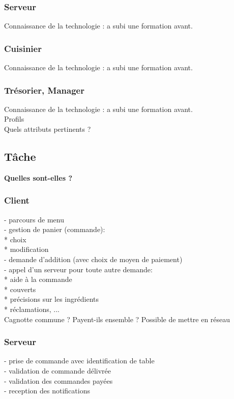 \documentclass[11pt]{article}
\begin{document}
\subsubsection{Serveur}
Connaissance de la technologie : a subi une formation avant.\\

\subsubsection{Cuisinier}
Connaissance de la technologie : a subi une formation avant.\\

\subsubsection{Trésorier, Manager}
Connaissance de la technologie : a subi une formation avant.\\

Profils\\
Quels attributs pertinents ?\\

\subsection{Tâche}
\textbf{Quelles sont-elles ?}\\
\subsubsection{Client}
- parcours de menu\\
- gestion de panier (commande): \\
         * choix\\
         * modification\\
- demande d'addition (avec choix de moyen de paiement)\\
- appel d'un serveur pour toute autre demande:\\
         * aide à la commande\\
         * couverts\\
         * précisions sur les ingrédients\\
         * réclamations, ...\\
Cagnotte commune ? Payent-ils ensemble ? Possible de mettre en réseau

\subsubsection{Serveur}
- prise de commande avec identification de table\\
- validation de commande délivrée\\
- validation des commandes payées\\
- reception des notifications\\
\end{document}
